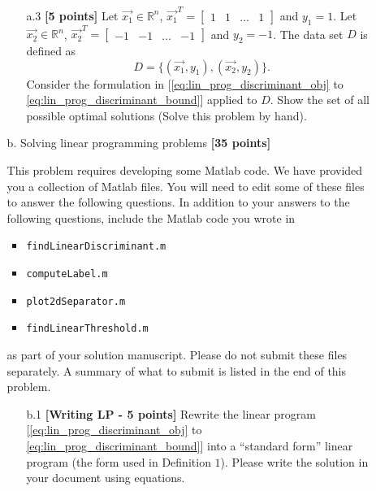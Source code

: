 \begin{enumerate}
\begin{enumerate}
\begin{enumerate}
\item [a.3] \textbf{[5 points]} 
Let $\vec{x_1} \in \mathbb{R}^n$, $\vec{x_1}^T =
\begin{bmatrix}
  1 & 1 & \ldots & 1
\end{bmatrix}$ and $y_1 = 1$. 
Let
$\vec{x_2} \in \mathbb{R}^n$, $\vec{x_2}^T =
\begin{bmatrix}
  -1 & -1 & \ldots & -1
\end{bmatrix}$ and $y_2 = -1$.
The data set $D$ is defined as
\begin{equation*}
    D = \{ (\vec{x_1},y_1), (\vec{x_2},y_2)\}.
\end{equation*}
Consider the formulation in
[\eqref{eq:lin_prog_discriminant_obj} to \eqref{eq:lin_prog_discriminant_bound}]
applied to
$D$. Show the set of all possible optimal solutions
(Solve this problem by hand).

  \end{enumerate}

\item[b.] Solving linear programming problems \textbf{[35 points]}

	This problem requires developing some Matlab code.
    We have provided you a collection of Matlab files.
    You will need to edit some of these files to answer the following questions.
    In addition to your answers to the following questions,
    include the Matlab code you wrote in 
    \begin{itemize}
      \item {\tt findLinearDiscriminant.m}
      \item {\tt computeLabel.m}
      \item {\tt plot2dSeparator.m}
      \item {\tt findLinearThreshold.m}
    \end{itemize}
    as part of your solution manuscript. Please do not submit these files 
    separately. A summary of what to submit is listed in the end of this problem.

  \begin{enumerate}
  \item [b.1] \textbf{[Writing LP - 5 points]} Rewrite the linear program
	[\eqref{eq:lin_prog_discriminant_obj} to \eqref{eq:lin_prog_discriminant_bound}]
	  into a ``standard form'' linear program (the form used in Definition $1$).
      Please write the solution in your document using equations.
      \ \\


\end{enumerate}
\end{enumerate}
\end{enumerate}
